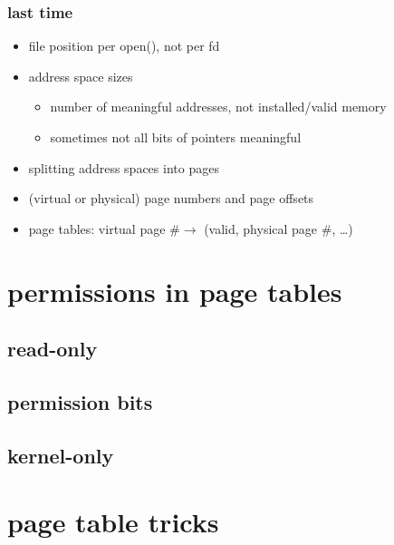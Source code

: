 \date{}
\title{}
\date{}

\begin{frame}
    \titlepage
\end{frame}


\usetikzlibrary{fit}

\begin{frame}
\frametitle{last time}
    \begin{itemize}
    \item file position per open(), not per fd
    \item address space sizes
        \begin{itemize}
        \item number of meaningful addresses, not installed/valid memory
        \item sometimes not all bits of pointers meaningful
        \end{itemize}
    \item splitting address spaces into pages
    \item (virtual or physical) page numbers and page offsets
    \item page tables: virtual page \#$\rightarrow$ (valid, physical page \#, \ldots)
    \end{itemize}
\end{frame}





\section{permissions in page tables}
\subsection{read-only}

\subsection{permission bits}


\subsection{kernel-only}


\section{page table tricks}
